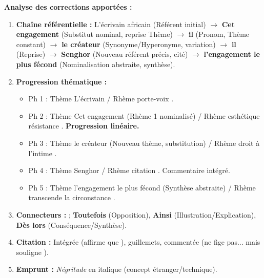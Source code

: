\documentclass[11pt]{article}
\begin{document}
\begin{exoresolu}
\textbf{Analyse des corrections apportées :}
\begin{enumerate}
    \item \textbf{Chaîne référentielle :} \og L'écrivain africain \fg (Référent initial) $\rightarrow$ \textbf{Cet engagement} (Substitut nominal, reprise Thème) $\rightarrow$ \textbf{il} (Pronom, Thème constant) $\rightarrow$ \textbf{le créateur} (Synonyme/Hyperonyme, variation) $\rightarrow$ \textbf{il} (Reprise) $\rightarrow$ \textbf{Senghor} (Nouveau référent précis, cité) $\rightarrow$ \textbf{l'engagement le plus fécond} (Nominalisation abstraite, synthèse).
    \item \textbf{Progression thématique :}
        \begin{itemize}
            \item Ph 1 : Thème \og L'écrivain \fg / Rhème \og porte-voix \fg.
            \item Ph 2 : Thème \og Cet engagement \fg (Rhème 1 nominalisé) / Rhème \og esthétique résistance \fg. \textbf{Progression linéaire.}
            \item Ph 3 : Thème \og le créateur \fg (Nouveau thème, substitution) / Rhème \og droit à l'intime \fg.
            \item Ph 4 : Thème \og Senghor \fg / Rhème \og citation \fg. Commentaire intégré.
            \item Ph 5 : Thème \og l'engagement le plus fécond \fg (Synthèse abstraite) / Rhème \og transcende la circonstance \fg.
        \end{itemize}
    \item \textbf{Connecteurs :} \og ; \textbf{Toutefois} \fg (Opposition), \og \textbf{Ainsi} \fg (Illustration/Explication), \og \textbf{Dès lors} \fg (Conséquence/Synthèse).
    \item \textbf{Citation :} Intégrée (\og affirme que \fg), guillemets, commentée (\og ne fige pas... mais souligne \fg).
    \item \textbf{Emprunt :} \emph{Négritude} en italique (concept étranger/technique).
\end{enumerate}
\end{exoresolu}
\end{document}
